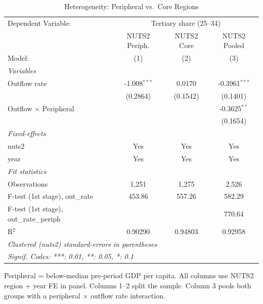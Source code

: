 \begin{table}[htbp]
   \caption{\label{tab:heterogeneity} Heterogeneity: Peripheral vs.\ Core Regions}
   \centering
   \scriptsize
   \begin{tabular}{lccc}
      \tabularnewline \midrule \midrule
      Dependent Variable: & \multicolumn{3}{c}{Tertiary share (25--34)}\\
                                              & NUTS2 Periph.  & NUTS2 Core & NUTS2 Pooled \\   
      Model:                                  & (1)            & (2)        & (3)\\  
      \midrule
      \emph{Variables}\\
      Outflow rate                            & -1.008$^{***}$ & 0.0170     & -0.3961$^{***}$\\   
                                              & (0.2864)       & (0.1542)   & (0.1401)\\   
      Outflow $\times$ Peripheral             &                &            & -0.3625$^{**}$\\   
                                              &                &            & (0.1654)\\   
      \midrule
      \emph{Fixed-effects}\\
      nuts2                                   & Yes            & Yes        & Yes\\  
      year                                    & Yes            & Yes        & Yes\\  
      \midrule
      \emph{Fit statistics}\\
      Observations                            & 1,251          & 1,275      & 2,526\\  
      F-test (1st stage), out\_rate           & 453.86         & 557.26     & 582.29\\  
      F-test (1st stage), out\_rate\_periph   &                &            & 770.64\\  
      R$^2$                                   & 0.90290        & 0.94803    & 0.92958\\  
      \midrule \midrule
      \multicolumn{4}{l}{\emph{Clustered (nuts2) standard-errors in parentheses}}\\
      \multicolumn{4}{l}{\emph{Signif. Codes: ***: 0.01, **: 0.05, *: 0.1}}\\
   \end{tabular}
   
   \par \raggedright 
   Peripheral = below-median pre-period GDP per capita. All columns use NUTS2 region + year FE in panel. Columns 1--2 split the sample. Column 3 pools both groups with a peripheral $\times$ outflow rate interaction.
\end{table}
